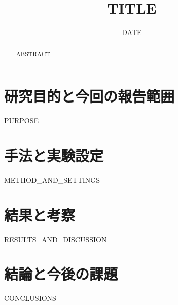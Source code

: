 \documentclass[a4paper,10pt,twocolumn]{ltjsarticle}
\title{TITLE}
\author{}
\date{DATE}
\begin{document}
\maketitle
\begin{abstract}
ABSTRACT
\end{abstract}
\section{研究目的と今回の報告範囲}
PURPOSE
\section{手法と実験設定}
METHOD_AND_SETTINGS
\section{結果と考察}
RESULTS_AND_DISCUSSION
\section{結論と今後の課題}
CONCLUSIONS
\end{document}
